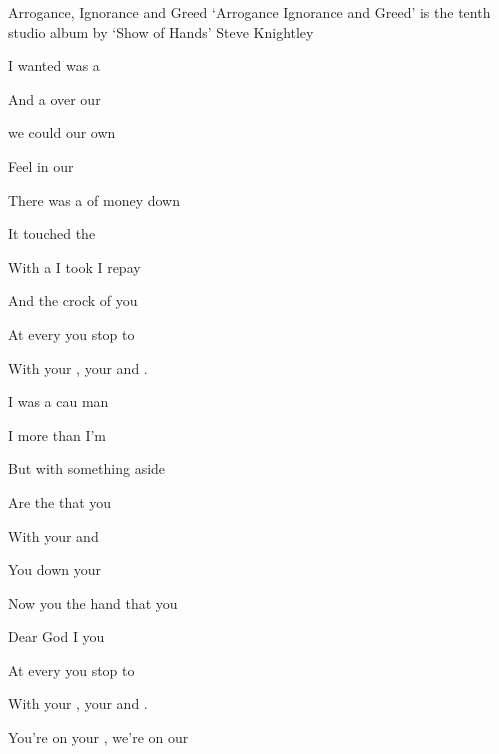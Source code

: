 \begin{SBSong}{Arrogance, Ignorance and Greed}
  {`Arrogance Ignorance and Greed' is the tenth studio album by `Show of Hands'}
  {Steve Knightley}
  \begin{SBVerse}
     I wanted was a   
    
    And a  over our 
    
     we could  our own 
    
    Feel  in our 
    
    There was a  of money  down 
    
    It  touched the  
    
    With a  I took I  repay 
    
    And the crock of  you  
  \end{SBVerse}
  
  \begin{SBChorus}
     At every  you stop to  

    With your , your  and .
  \end{SBChorus}
  \begin{SBVerse}
    I  was a cau man
    
    I  more than I'm 
    
    But  with something  aside 
    
    Are the  that you 
    
    With your  and 
    
    You  down your 
    
    Now you  the hand that  you
    
    Dear God I  you  
  \end{SBVerse}
  \begin{SBChorus}
     At every  you stop to  

    With your , your  and . 
    
     You're on your , we're on our 
    

\end{SBChorus}
\end{SBSong}
